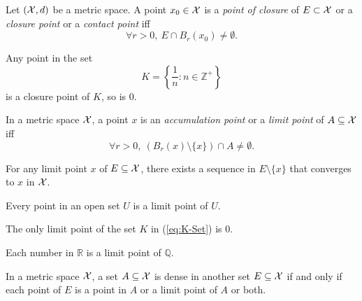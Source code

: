 \begin{defn}
  \label{def:closurePointInMetricSpace}
  Let $({\cal X},d)$ be a metric space.
  A point $x_0\in {\cal X}$ is %
  a \emph{point of closure} of $E\subset {\cal X}$
  or a \emph{closure point} or a \emph{contact point}
  iff
  \begin{equation}
    \label{eq:closurePoint}
    \forall r>0, \ E\cap B_r(x_0) \ne \emptyset.
  \end{equation}
\end{defn}

\begin{exm}
  Any point in the set
   \begin{equation}
     \label{eq:K-Set}
     K=\left\{\frac{1}{n}: n\in \mathbb{Z}^+\right\}
   \end{equation}
   is a closure point of $K$,
   so is 0.
\end{exm}

\begin{defn}
  \label{def:limitPointMetricSpace}
  In a metric space ${\cal X}$, a point $x$ 
   is an \emph{accumulation point}
   or a \emph{limit point} of $A\subseteq {\cal X}$ iff
  \begin{equation}
    \label{eq:accumulationPointMetricSpace}
    \forall r>0,\ \left(B_r(x)\setminus\{x\}\right)\cap A
    \ne \emptyset. 
  \end{equation}
\end{defn}

\begin{lem}
  \label{lem:limitPointImpliesConvergence}
  For any limit point $x$ of $E\subseteq {\cal X}$,
  there exists a sequence in $E\setminus \{x\}$
  that converges to $x$ in ${\cal X}$.
\end{lem}

\begin{exm}
  Every point in an open set $U$ is a limit point of $U$. 
\end{exm}

\begin{exm}
  The only limit point of the set $K$ in (\ref{eq:K-Set}) is 0.
\end{exm}

\begin{exm}
  Each number in $\mathbb{R}$ 
   is a limit point of $\mathbb{Q}$.
\end{exm}

\begin{lem}
  \label{lem:denseSet}
  In a metric space ${\cal X}$,
  a set $A\subseteq {\cal X}$ is dense
  in another set $E\subseteq{\cal X}$
  if and only if %
  each point of $E$ is a point in $A$
  or a limit point of $A$ or both.
\end{lem}

